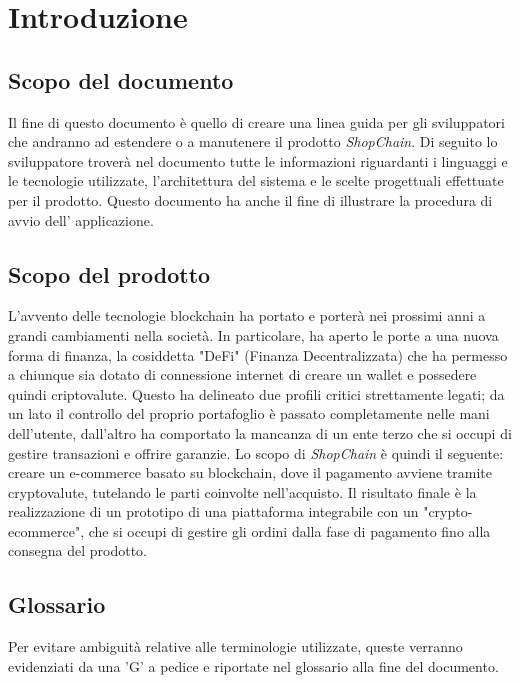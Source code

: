 

\section{Introduzione} \label{section:introduzione}
\subsection{Scopo del documento}
Il fine di questo documento è quello di creare una linea guida per gli sviluppatori che andranno ad estendere o a manutenere il prodotto \textit{ShopChain}.
Di seguito lo sviluppatore troverà nel documento tutte le informazioni riguardanti i linguaggi e le tecnologie utilizzate, l'architettura del sistema e le scelte progettuali effettuate per il prodotto.
Questo documento ha anche il fine di illustrare la procedura di avvio dell' applicazione.
\subsection{Scopo del prodotto}
L'avvento delle tecnologie blockchain\glo{} ha portato e porterà nei prossimi anni a grandi cambiamenti nella società.
In particolare, ha aperto le porte a una nuova forma di finanza, la cosiddetta "DeFi" (Finanza Decentralizzata) che ha permesso a chiunque sia dotato di connessione internet di creare un wallet\glo{} e possedere quindi criptovalute\glo{}.
Questo ha delineato due profili critici strettamente legati; da un lato il controllo del proprio portafoglio è passato completamente nelle mani dell'utente, dall'altro ha comportato la mancanza di un ente terzo che si occupi di gestire transazioni e offrire garanzie.
\newline
Lo scopo di \textit{ShopChain} è quindi il seguente: creare un e-commerce\glo{} basato su blockchain\glo{}, dove il pagamento avviene tramite cryptovalute\glo{}, tutelando le parti coinvolte nell'acquisto.
\newline
Il risultato finale è la realizzazione di un prototipo di una piattaforma integrabile con un "crypto-ecommerce\glo{}", che si occupi di gestire gli ordini dalla fase di pagamento fino alla consegna del prodotto.

\subsection{Glossario}
Per evitare ambiguità relative alle terminologie utilizzate, queste verranno evidenziati da una 'G' a pedice e riportate nel glossario alla fine del documento.
